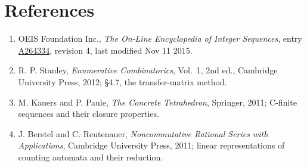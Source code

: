 \documentclass[11pt]{article}
\theoremstyle{definition}
\begin{document}
\section{References}

\begin{enumerate}

\item OEIS Foundation Inc., \emph{The On-Line Encyclopedia of Integer Sequences}, entry \href{https://oeis.org/A264334}{A264334}, revision 4, last modified Nov 11 2015.

\item R. P. Stanley, \emph{Enumerative Combinatorics}, Vol.~1, 2nd ed., Cambridge University Press, 2012; \S4.7, the transfer-matrix method.

\item M. Kauers and P. Paule, \emph{The Concrete Tetrahedron}, Springer, 2011; C-finite sequences and their closure properties.

\item J. Berstel and C. Reutenauer, \emph{Noncommutative Rational Series with Applications}, Cambridge University Press, 2011; linear representations of counting automata and their reduction.

\end{enumerate}
\end{document}
